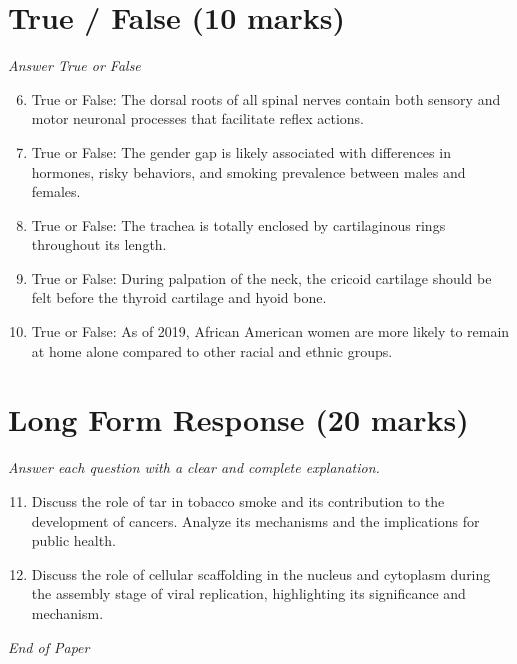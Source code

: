 \documentclass[12pt]{article}
\begin{document}
\section*{True / False (10 marks)}
\textit{Answer True or False}
\begin{enumerate}[label=\arabic*.]
\setcounter{enumi}{5}
\item True or False: The dorsal roots of all spinal nerves contain both sensory and motor neuronal processes that facilitate reflex actions.
\item True or False: The gender gap is likely associated with differences in hormones, risky behaviors, and smoking prevalence between males and females.
\item True or False: The trachea is totally enclosed by cartilaginous rings throughout its length.
\item True or False: During palpation of the neck, the cricoid cartilage should be felt before the thyroid cartilage and hyoid bone.
\item True or False: As of 2019, African American women are more likely to remain at home alone compared to other racial and ethnic groups.
\end{enumerate}

\section*{Long Form Response (20 marks)}
\textit{Answer each question with a clear and complete explanation.}
\begin{enumerate}[label=\arabic*.]
\setcounter{enumi}{10}
\item Discuss the role of tar in tobacco smoke and its contribution to the development of cancers. Analyze its mechanisms and the implications for public health.
\item Discuss the role of cellular scaffolding in the nucleus and cytoplasm during the assembly stage of viral replication, highlighting its significance and mechanism.
\end{enumerate}

\vfill
\noindent\textit{End of Paper}
\end{document}
